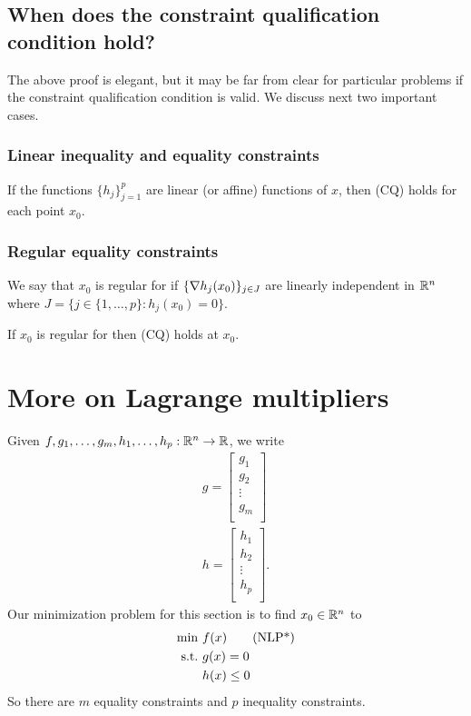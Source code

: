 \subsection{When does the constraint qualification condition hold?}

The above proof is elegant, but it may be far from clear for particular problems if the constraint qualification condition is valid. We discuss next two important cases.

\subsubsection{Linear inequality and equality constraints}

\begin{theorem}
If the functions $\{ h_j \}_{j=1}^{p}$ are linear (or affine) functions of $x$, then (CQ) holds for each point $x_0$.
\end{theorem}

\subsubsection{Regular equality constraints}

\begin{definition}
We say that $x_0$ is regular for  if $\{ \nabla h_j(x_0) \}_{j \in J}$ are linearly independent in $\mathbb{R}^n$ where $J = \{ j \in \{1, \dots, p\} : h_j(x_0) = 0 \}$.
\end{definition}

\begin{theorem}
If $x_0$ is regular for  then (CQ) holds at $x_0$.
\end{theorem}

\section{More on Lagrange multipliers}

Given $f, g_1, \dots, g_m, h_1, \dots, h_p : \mathbb{R}^n \to \mathbb{R}$, we write 
\begin{align}
g = \begin{bmatrix}
g_1 \\
g_2 \\
\vdots \\
g_m \\
\end{bmatrix} \\
h = \begin{bmatrix}
h_1 \\
h_2 \\
\vdots \\
h_p \\
\end{bmatrix}.
\end{align}
Our minimization problem for this section is to find $x_0 \in \mathbb{R}^n$ to 
\begin{align}
\min \ & f(x) \tag{NLP*} \labeq{NLPs} \\
\st    & g(x) = 0 \nonumber \\
       & h(x) \le 0 \nonumber
\end{align}
So there are $m$ equality constraints and $p$ inequality constraints.

